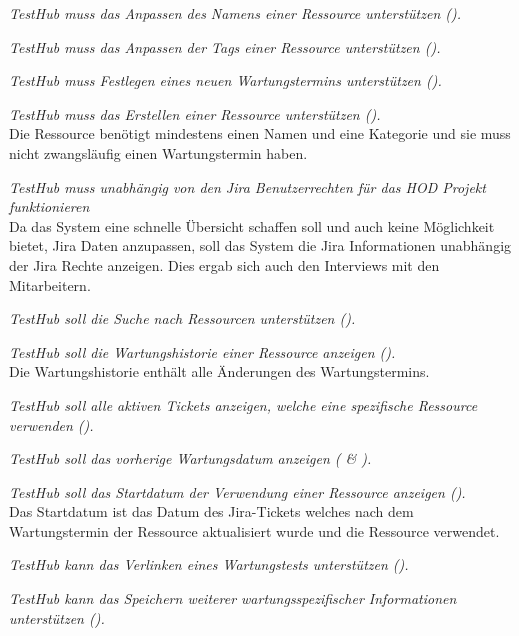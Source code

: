 \begin{description}
    \textit{TestHub muss das Anpassen des Namens einer Ressource unterstützen 
    ().}

    \textit{TestHub muss das Anpassen der Tags einer Ressource unterstützen 
    ().}

    \textit{TestHub muss Festlegen eines neuen Wartungstermins unterstützen 
    ().}

    \textit{TestHub muss das Erstellen einer Ressource unterstützen 
    ().}\\
    Die Ressource benötigt mindestens einen Namen und eine Kategorie und sie muss nicht zwangsläufig 
    einen Wartungstermin haben.

    \textit{TestHub muss unabhängig von den \gls{Jira} Benutzerrechten für das HOD Projekt funktionieren}\\
    Da das System eine schnelle Übersicht schaffen soll und auch keine Möglichkeit
    bietet, \gls{Jira} Daten anzupassen, soll das System die \gls{Jira} Informationen unabhängig der \gls{Jira} Rechte anzeigen.
    Dies ergab sich auch den Interviews mit den Mitarbeitern.



    \textit{TestHub soll die Suche nach Ressourcen unterstützen ().}

    \textit{TestHub soll die Wartungshistorie einer Ressource anzeigen ().}\\
    Die Wartungshistorie enthält alle Änderungen des Wartungstermins.

    \textit{TestHub soll alle aktiven Tickets anzeigen, welche eine spezifische 
    Ressource verwenden ().}

    \textit{TestHub soll das vorherige Wartungsdatum anzeigen ( \& ).}
    
    \textit{TestHub soll das Startdatum der Verwendung einer Ressource anzeigen ().}\\
    Das Startdatum ist das Datum des Jira-Tickets welches nach dem Wartungstermin 
    der Ressource aktualisiert wurde und die Ressource verwendet.


    \textit{TestHub kann das Verlinken eines Wartungstests unterstützen 
    ().}

    \textit{TestHub kann das Speichern weiterer wartungsspezifischer Informationen unterstützen 
    ().}

\end{description}

